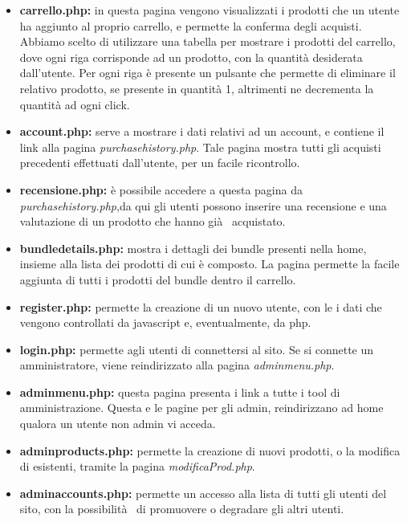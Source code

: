 \begin{itemize}
\item \textbf{carrello.php:} in questa pagina vengono visualizzati i prodotti che un utente ha aggiunto al proprio carrello, e permette la conferma degli acquisti. Abbiamo scelto di utilizzare una tabella per mostrare i prodotti del carrello, dove ogni riga corrisponde ad un prodotto, con la quantità desiderata dall'utente. Per ogni riga è presente un pulsante che permette di eliminare il relativo prodotto, se presente in quantità 1, altrimenti ne decrementa la quantità ad ogni click.

\item \textbf{account.php:} serve a mostrare i dati relativi ad un account, e contiene il link alla pagina \textit{purchasehistory.php}.
Tale pagina mostra tutti gli acquisti precedenti effettuati dall'utente, per un facile ricontrollo.

\item \textbf{recensione.php:} è possibile accedere a questa pagina da \textit{purchasehistory.php},da qui gli utenti possono inserire una recensione e una valutazione di un prodotto che hanno già  acquistato.

\item \textbf{bundledetails.php:} mostra i dettagli dei bundle presenti nella home, insieme alla lista dei prodotti di cui è composto. La pagina permette la facile aggiunta di tutti i prodotti del bundle dentro il carrello.

\item \textbf{register.php:} permette la creazione di un nuovo utente, con le i dati che vengono controllati da javascript e, eventualmente, da php.

\item \textbf{login.php:} permette agli utenti di connettersi al sito. Se si connette un amministratore, viene reindirizzato alla pagina \textit{adminmenu.php}.

\item \textbf{adminmenu.php:} questa pagina presenta i link a tutte i tool di amministrazione. Questa e le pagine per gli admin, reindirizzano ad home qualora un utente non admin vi acceda.

\item \textbf{adminproducts.php:} permette la creazione di nuovi prodotti, o la modifica di esistenti, tramite la pagina \textit{modificaProd.php}.

\item \textbf{adminaccounts.php:} permette un accesso alla lista di tutti gli utenti del sito, con la possibilità  di promuovere o degradare gli altri utenti.


\end{itemize}
